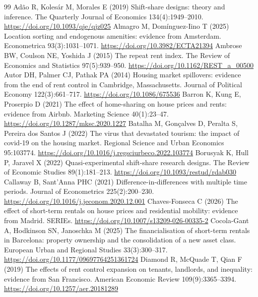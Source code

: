 \begin{thebibliography}{99}\small\setlength{\itemsep}{1pt}
 Adão R, Kolesár M, Morales E (2019) Shift-share designs: theory and inference. The Quarterly Journal of Economics 134(4):1949--2010. \url{https://doi.org/10.1093/qje/qjz025}
 Almagro M, Domínguez-Iino T (2025) Location sorting and endogenous amenities: evidence from Amsterdam. Econometrica 93(3):1031--1071. \url{https://doi.org/10.3982/ECTA21394}
 Ambrose BW, Coulson NE, Yoshida J (2015) The repeat rent index. The Review of Economics and Statistics 97(5):939--950. \url{https://doi.org/10.1162/REST_a_00500}
 Autor DH, Palmer CJ, Pathak PA (2014) Housing market spillovers: evidence from the end of rent control in Cambridge, Massachusetts. Journal of Political Economy 122(3):661--717. \url{https://doi.org/10.1086/675536}
 Barron K, Kung E, Proserpio D (2021) The effect of home-sharing on house prices and rents: evidence from Airbnb. Marketing Science 40(1):23--47. \url{https://doi.org/10.1287/mksc.2020.1227}
 Batalha M, Gonçalves D, Peralta S, Pereira dos Santos J (2022) The virus that devastated tourism: the impact of covid-19 on the housing market. Regional Science and Urban Economics 95:103774. \url{https://doi.org/10.1016/j.regsciurbeco.2022.103774}
 Borusyak K, Hull P, Jaravel X (2022) Quasi-experimental shift-share research designs. The Review of Economic Studies 89(1):181--213. \url{https://doi.org/10.1093/restud/rdab030}
 Callaway B, Sant'Anna PHC (2021) Difference-in-differences with multiple time periods. Journal of Econometrics 225(2):200--230. \url{https://doi.org/10.1016/j.jeconom.2020.12.001}
 Chaves-Fonseca C (2026) The effect of short-term rentals on house prices and residential mobility: evidence from Madrid. SERIEs. \url{https://doi.org/10.1007/s13209-026-00335-2}
 Cocola-Gant A, Hodkinson SN, Janoschka M (2025) The financialisation of short-term rentals in Barcelona: property ownership and the consolidation of a new asset class. European Urban and Regional Studies 33(3):300--317. \url{https://doi.org/10.1177/09697764251361724}
 Diamond R, McQuade T, Qian F (2019) The effects of rent control expansion on tenants, landlords, and inequality: evidence from San Francisco. American Economic Review 109(9):3365--3394. \url{https://doi.org/10.1257/aer.20181289}

\end{thebibliography}
